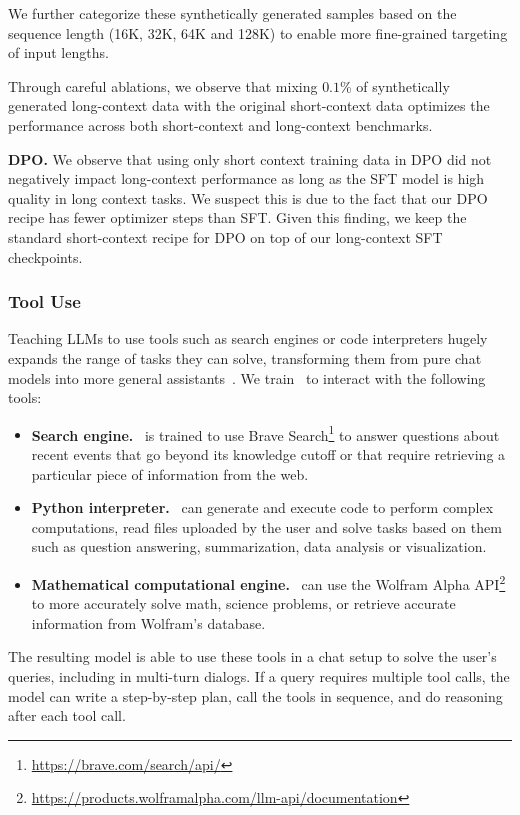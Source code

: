 We further categorize these synthetically generated samples based on the sequence length (16K, 32K, 64K and 128K) to enable more fine-grained targeting of input lengths.

Through careful ablations, we observe that mixing $0.1$\% of synthetically generated long-context data with the original short-context data optimizes the performance across both short-context and long-context benchmarks. 

\textbf{DPO.} 
We observe that using only short context training data in DPO did not negatively impact long-context performance as long as the SFT model is high quality in long context tasks. We suspect this is due to the fact that our DPO recipe has fewer optimizer steps than SFT.  Given this finding, we keep the standard short-context recipe for DPO on top of our long-context SFT checkpoints.

\subsubsection{Tool Use}
\label{subsubsec:tool_use}

Teaching LLMs to use tools such as search engines or code interpreters hugely expands the range of tasks they can solve, transforming them from pure chat models into more general assistants~\citep{nakano2021webgpt,thoppilan2022lamdalanguagemodelsdialog,parisi2022talm,gao2023pal,mialon2023augmented,schick2024toolformer}. We train \llamathree~to interact with the following tools:


\begin{itemize}
    \item \textbf{Search engine.} \llamathree~is trained to use Brave Search\footnote{\url{https://brave.com/search/api/}} to answer questions about recent events that go beyond its knowledge cutoff or that require retrieving a particular piece of information from the web.
    \item \textbf{Python interpreter.} \llamathree~can generate and execute code to perform complex computations, read files uploaded by the user and solve tasks based on them such as question answering, summarization, data analysis or visualization. 
    \item \textbf{Mathematical computational engine.} \llamathree~can use the Wolfram Alpha API\footnote{\url{https://products.wolframalpha.com/llm-api/documentation}} to more accurately solve math, science problems, or retrieve accurate information from Wolfram's database. 
\end{itemize}
The resulting model is able to use these tools in a chat setup to solve the user's queries, including in multi-turn dialogs. If a query requires multiple tool calls, the model can write a step-by-step plan, call the tools in sequence, and do reasoning after each tool call. %

